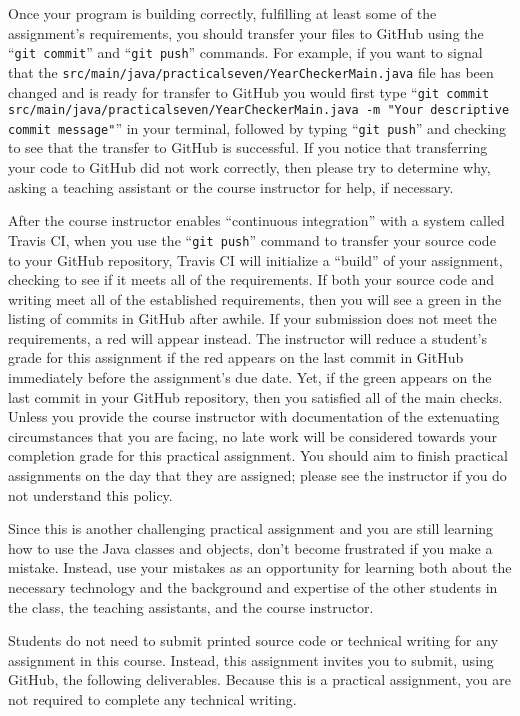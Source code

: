 \documentclass[11pt]{article}
\newcommand{\mainprogramsource}{\lstinline{src/main/java/practicalseven/YearCheckerMain.java}}
\newcommand{\gitcommit}{\command{git commit}}
\newcommand{\gitpush}{\command{git push}}
\newcommand{\gitcommitmainprogram}{\command{git commit src/main/java/practicalseven/YearCheckerMain.java -m "Your
descriptive commit message"}}
\newcommand{\command}[1]{``\lstinline{#1}''}
\newcommand{\step}[1]{``{#1}''}
\newcommand{\checkmark}{\ding{51}}
\newcommand{\naughtmark}{\ding{55}}
\begin{document}
Once your program is building correctly, fulfilling at least some of the
assignment's requirements, you should transfer your files to GitHub using the
\gitcommit{} and \gitpush{} commands. For example, if you want to signal that
the \mainprogramsource{} file has been changed and is ready for transfer to
GitHub you would first type \gitcommitmainprogram{} in your terminal, followed
by typing \gitpush{} and checking to see that the transfer to GitHub is
successful. If you notice that transferring your code to GitHub did not work
correctly, then please try to determine why, asking a teaching assistant or the
course instructor for help, if necessary.

After the course instructor enables \step{continuous integration} with a system called Travis CI, when you use the
\gitpush{} command to transfer your source code to your GitHub repository, Travis CI will initialize a \step{build} of
your assignment, checking to see if it meets all of the requirements. If both your source code and writing meet all of
the established requirements, then you will see a green \checkmark{} in the listing of commits in GitHub after awhile.
If your submission does not meet the requirements, a red \naughtmark{} will appear instead. The instructor will reduce a
student's grade for this assignment if the red \naughtmark{} appears on the last commit in GitHub immediately before the
assignment's due date. Yet, if the green \checkmark{} appears on the last commit in your GitHub repository, then you
satisfied all of the main checks. Unless you provide the course instructor with documentation of the extenuating
circumstances that you are facing, no late work will be considered towards your completion grade for this practical
assignment. You should aim to finish practical assignments on the day that they are assigned; please see the instructor
if you do not understand this policy.

Since this is another challenging practical assignment and you are still learning how to use the Java classes and
objects, don't become frustrated if you make a mistake. Instead, use your mistakes as an opportunity for learning both
about the necessary technology and the background and expertise of the other students in the class, the teaching
assistants, and the course instructor.

\noindent Students do not need to submit printed source code or technical writing for any assignment in this course.
Instead, this assignment invites you to submit, using GitHub, the following deliverables. Because this is a practical
assignment, you are not required to complete any technical writing.
\end{document}
